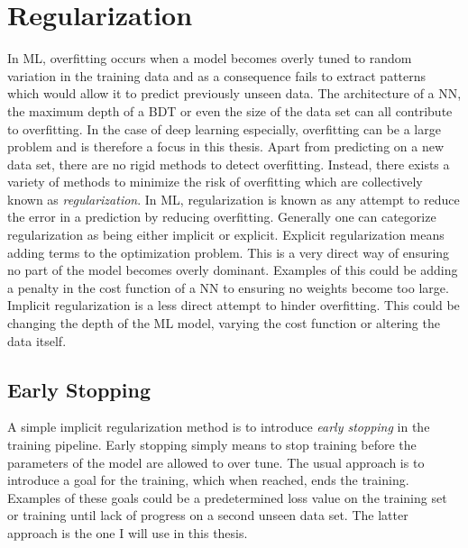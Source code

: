 \section{Regularization}\label{sec:Regularization}
In \ac{ML}, overfitting occurs when a model becomes overly tuned to random variation in the training data and as a consequence 
fails to extract patterns which would allow it to predict previously unseen data. The architecture of a \ac{NN}, 
the maximum depth of a \ac{BDT} or even the size of the data set can all contribute to overfitting. In the 
case of deep learning especially, overfitting can be a large problem and is therefore a focus in this thesis. Apart 
from predicting on a new data set, there are no rigid methods to detect overfitting. Instead, there exists 
a variety of methods to minimize the risk of overfitting which are collectively known as \emph{regularization}. In \ac{ML}, 
regularization is known as any attempt to reduce the error in a prediction by reducing overfitting. Generally one can categorize
regularization as being either implicit or explicit. Explicit regularization means adding terms to the optimization 
problem. This is a very direct way of ensuring no part of the model becomes overly dominant. Examples of this 
could be adding a penalty in the cost function of a \ac{NN} to ensuring no weights become too large. Implicit
regularization is a less direct attempt to hinder overfitting. This could be changing the depth of the \ac{ML} model,
varying the cost function or altering the data itself.
\subsection{Early Stopping}\label{subsec:EarlyStopping}
A simple implicit regularization method is to introduce \emph{early stopping} in the training pipeline. Early stopping 
simply means to stop training before the parameters of the model are allowed to over tune. The usual approach 
is to introduce a goal for the training, which when reached, ends the training. Examples of these goals could be a 
predetermined loss value on the training set or training until lack of progress on a second unseen data set. The latter
approach is the one I will use in this thesis. 
